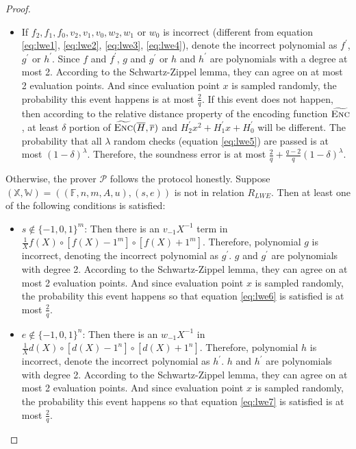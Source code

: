 \begin{proof}
\begin{itemize}
    \item If $f_2, f_1, f_0, v_2, v_1, v_0, w_2, w_1$ or $w_0$ is incorrect (different from equation \ref{eq:lwe1}, \ref{eq:lwe2}, \ref{eq:lwe3}, \ref{eq:lwe4}), denote the incorrect polynomial as $f^\prime$, $g^\prime$ or $h^\prime$. Since $f$ and $f^\prime$, $g$ and $g^\prime$ or $h$ and $h^\prime$ are polynomials with a degree at most 2. According to the Schwartz-Zippel lemma, they can agree on at most 2 evaluation points. And since evaluation point $x$ is sampled randomly, the probability this event happens is at most $\frac{2}{q}$. If this event does not happen, then according to the relative distance property of the encoding function $\widetilde{\textsc{Enc}}$, at least $\delta$ portion of $\widetilde{\textsc{Enc}}(\overline{H}, \overline{r})$ and $H_2^\prime x^2 + H_1^\prime x + H_0^\prime$ will be different. The probability that all $\lambda$ random checks (equation \ref{eq:lwe5}) are passed is at most $(1 - \delta)^\lambda$. Therefore, the soundness error is at most $\frac{2}{q} + \frac{q-2}{q}(1 - \delta)^\lambda$.


\end{itemize}

Otherwise, the prover $\mathcal{P}$ follows the protocol honestly. Suppose $(\mathbb{X}, \mathbb{W}) = ((\mathbb{F}, n, m, A, u), (s, e))$ is not in relation $R_{LWE}$. Then at least one of the following conditions is satisfied:
\begin{itemize}
    \item $s \notin \{-1, 0, 1\}^{m}$: Then there is an $v_{-1} X^{-1}$ term in $\frac{1}{X} f(X) \circ [f(X) - 1^m] \circ [f(X) + 1^m]$. Therefore, polynomial $g$ is incorrect, denoting the incorrect polynomial as $g^\prime$. $g$ and $g^\prime$ are polynomials with degree 2. According to the Schwartz-Zippel lemma, they can agree on at most 2 evaluation points. And since evaluation point $x$ is sampled randomly, the probability this event happens so that equation \ref{eq:lwe6} is satisfied is at most $\frac{2}{q}$. 
    
    \item $e \notin \{-1, 0, 1\}^{n}$: Then there is an $w_{-1} X^{-1}$ in $\frac{1}{X} d(X) \circ [d(X) - 1^n] \circ [d(X) + 1^n]$. Therefore, polynomial $h$ is incorrect, denote the incorrect polynomial as $h^\prime$. $h$ and $h^\prime$ are polynomials with degree 2. According to the Schwartz-Zippel lemma, they can agree on at most 2 evaluation points. And since evaluation point $x$ is sampled randomly, the probability this event happens so that equation \ref{eq:lwe7} is satisfied is at most $\frac{2}{q}$. 
    

\end{itemize}
\end{proof}
